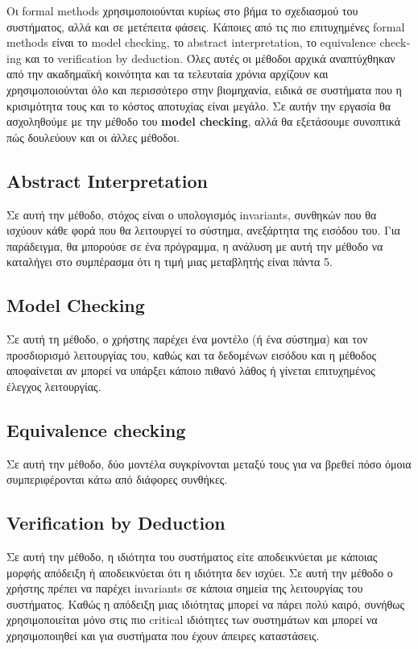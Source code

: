 \documentclass{article}
\newcommand{\english}[1]{\foreignlanguage{english}{{#1}}}
\begin{document}
Οι \english{formal methods} χρησιμοποιούνται κυρίως στο βήμα το σχεδιασμού του συστήματος, αλλά και σε μετέπειτα φάσεις. Κάποιες από τις πιο επιτυχημένες \english{formal methods} είναι το \english{model checking}, το \english{abstract interpretation}, το \english{equivalence checking} και το \english{verification by deduction}. Όλες αυτές οι μέθοδοι αρχικά αναπτύχθηκαν από την ακαδημαϊκή κοινότητα και τα τελευταία χρόνια αρχίζουν και χρησιμοποιούνται όλο και περισσότερο στην βιομηχανία, ειδικά σε συστήματα που η κρισιμότητα τους και το κόστος αποτυχίας είναι μεγάλο. 
Σε αυτήν την εργασία θα ασχοληθούμε με την μέθοδο του \english{\textbf{model checking}}, αλλά θα εξετάσουμε συνοπτικά πώς δουλεύουν και οι άλλες μέθοδοι.

\subsection*{\english{Abstract Interpretation}}

Σε αυτή την μέθοδο, στόχος είναι ο υπολογισμός invariants, συνθηκών που θα ισχύουν κάθε φορά που θα λειτουργεί το σύστημα, ανεξάρτητα της εισόδου του. Για παράδειγμα, θα μπορούσε σε ένα πρόγραμμα, η ανάλυση με αυτή την μέθοδο να καταλήγει στο συμπέρασμα ότι η τιμή μιας μεταβλητής είναι πάντα 5. 

\subsection*{\english{Model Checking}}

Σε αυτή τη μέθοδο, ο χρήστης παρέχει ένα μοντέλο (ή ένα σύστημα) και τον προσδιορισμό λειτουργίας του, καθώς και τα δεδομένων εισόδου και η μέθοδος αποφαίνεται αν μπορεί να υπάρξει κάποιο πιθανό λάθος ή γίνεται επιτυχημένος έλεγχος λειτουργίας.

\subsection*{\english{Equivalence checking}}

Σε αυτή την μέθοδο, δύο μοντέλα συγκρίνονται μεταξύ τους για να βρεθεί πόσο όμοια συμπεριφέρονται κάτω από διάφορες συνθήκες.

\subsection*{\english{Verification by Deduction}}

Σε αυτή την μέθοδο, η ιδιότητα του συστήματος είτε αποδεικνύεται με κάποιας μορφής απόδειξη ή αποδεικνύεται ότι η ιδιότητα δεν ισχύει. Σε αυτή την μέθοδο ο χρήστης πρέπει να παρέχει invariants σε κάποια σημεία της λειτουργίας του συστήματος. Καθώς η απόδειξη μιας ιδιότητας μπορεί να πάρει πολύ καιρό, συνήθως χρησιμοποιείται μόνο στις πιο critical ιδιότητες των συστημάτων και μπορεί να χρησιμοποιηθεί και για συστήματα που έχουν άπειρες καταστάσεις. 
\end{document}
